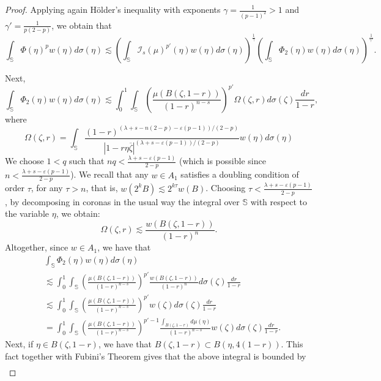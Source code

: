 \documentclass[12pt,twoside,leqno,final]{amsart}
\theoremstyle{plain}
\begin{document}
\begin{proof}
Applying again H\"older's inequality with exponents $\gamma=\frac1{(p-1)^2}>1$ and $\gamma'=\frac1{p(2-p)}$, we obtain that
$$
\int_{{\mathbb S}}\Phi(\eta)^p w(\eta)d\sigma(\eta)
 \lesssim \left(\int_{{\mathbb S}} \mathcal{I}_s(\mu)^{p'}(\eta) w(\eta)d\sigma(\eta)\right)^\frac1{\gamma} 
 \left(\int_{{\mathbb S}}\Phi_2(\eta)w(\eta)d\sigma(\eta) \right)^\frac1{\gamma'}.
$$

Next,
\begin{equation*} 
\int_{{\mathbb S}} \Phi_2(\eta)w(\eta)d\sigma(\eta) 
 \lesssim\int_0^1\int_{{\mathbb S}} \left(\frac{\mu(B(\zeta, 1-r))}{(1-r)^{n-s}}\right)^{p'}\Omega(\zeta,r)d\sigma(\zeta)\frac{dr}{1-r},
\end{equation*}
where $$
\Omega(\zeta,r)=\int_{{\mathbb S}}
\frac{(1-r)^{(\lambda+s-n(2-p)-\varepsilon(p-1))/(2-p)}}{|1-r\eta\overline{\zeta}|^{(\lambda+s-\varepsilon(p-1))/
(2-p)}}w(\eta)d\sigma(\eta)
$$
We choose $1<q$ such that   $nq<\frac{\lambda+s-\varepsilon(p-1)}{2-p}$ (which is possible since $n<\frac{\lambda+s-\varepsilon(p-1)}{2-p}$). We recall that any $w\in A_1$ satisfies a doubling condition of order $\tau$, for any $\tau>n$, that is, $w(2^kB)\lesssim 2^{k\tau} w(B)$. Choosing $\tau<\frac{\lambda+s-\varepsilon(p-1)}{2-p}$, by decomposing in coronas in the usual way the integral over ${{\mathbb S}}$ with respect to the variable $\eta$, we obtain:
$$
\Omega(\zeta,r)\lesssim \frac{w(B(\zeta,1-r))}{(1-r)^n}.
$$
Altogether, since $w\in A_1$, we have that 
\begin{equation*}\begin{split}&
\int_{{\mathbb S}} \Phi_2(\eta)w(\eta)d\sigma(\eta)\\&\lesssim\int_0^1 \int_{{\mathbb S}} \left( \frac{\mu(B(\zeta,1-r))}{(1-r)^{n-s}}\right)^{p'}\frac{w(B(\zeta,1-r))}{(1-r)^n} d\sigma(\zeta)\frac{dr}{1-r}\\&
\lesssim \int_0^1 \int_{{\mathbb S}} \left( \frac{\mu(B(\zeta,1-r))}{(1-r)^{n-s}}\right)^{p'}w(\zeta) d\sigma(\zeta) \frac{dr}{1-r}\\&
=\int_0^1 \int_{{\mathbb S}} \left( \frac{\mu(B(\zeta,1-r))}{(1-r)^{n-s}}\right)^{p'-1}\frac{\int_{B(\zeta,1-r)}d\mu(\eta)}{(1-r)^{n-s}}w(\zeta) d\sigma(\zeta) \frac{dr}{1-r}.
\end{split}
\end{equation*}
Next, if $\eta\in B(\zeta,1-r)$, we have that $B(\zeta,1-r)\subset B(\eta, 4(1-r))$. This fact together with Fubini's Theorem  gives  that the above integral is bounded by
\begin{equation*}\begin{split}&

\end{split}
\end{equation*}
\end{proof}
\end{document}
